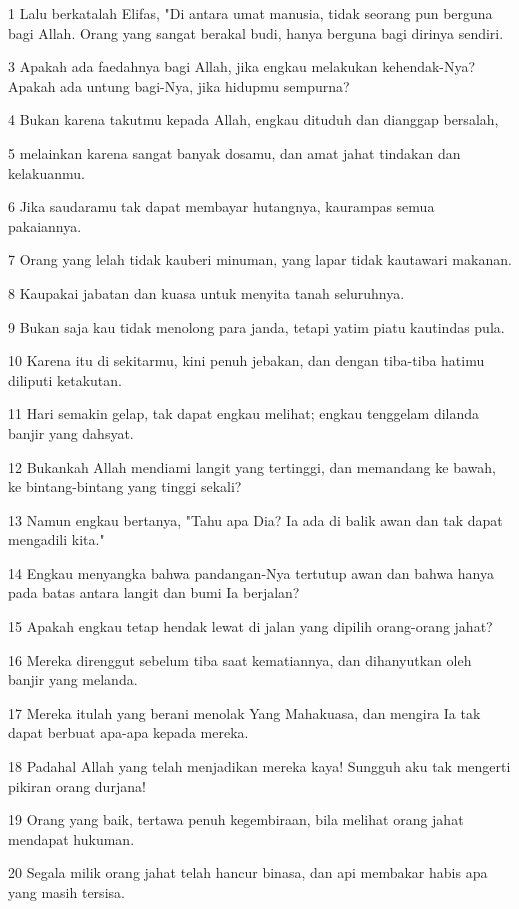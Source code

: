 \par 1 Lalu berkatalah Elifas, "Di antara umat manusia, tidak seorang pun berguna bagi Allah. Orang yang sangat berakal budi, hanya berguna bagi dirinya sendiri.
\par 3 Apakah ada faedahnya bagi Allah, jika engkau melakukan kehendak-Nya? Apakah ada untung bagi-Nya, jika hidupmu sempurna?
\par 4 Bukan karena takutmu kepada Allah, engkau dituduh dan dianggap bersalah,
\par 5 melainkan karena sangat banyak dosamu, dan amat jahat tindakan dan kelakuanmu.
\par 6 Jika saudaramu tak dapat membayar hutangnya, kaurampas semua pakaiannya.
\par 7 Orang yang lelah tidak kauberi minuman, yang lapar tidak kautawari makanan.
\par 8 Kaupakai jabatan dan kuasa untuk menyita tanah seluruhnya.
\par 9 Bukan saja kau tidak menolong para janda, tetapi yatim piatu kautindas pula.
\par 10 Karena itu di sekitarmu, kini penuh jebakan, dan dengan tiba-tiba hatimu diliputi ketakutan.
\par 11 Hari semakin gelap, tak dapat engkau melihat; engkau tenggelam dilanda banjir yang dahsyat.
\par 12 Bukankah Allah mendiami langit yang tertinggi, dan memandang ke bawah, ke bintang-bintang yang tinggi sekali?
\par 13 Namun engkau bertanya, "Tahu apa Dia? Ia ada di balik awan dan tak dapat mengadili kita."
\par 14 Engkau menyangka bahwa pandangan-Nya tertutup awan dan bahwa hanya pada batas antara langit dan bumi Ia berjalan?
\par 15 Apakah engkau tetap hendak lewat di jalan yang dipilih orang-orang jahat?
\par 16 Mereka direnggut sebelum tiba saat kematiannya, dan dihanyutkan oleh banjir yang melanda.
\par 17 Mereka itulah yang berani menolak Yang Mahakuasa, dan mengira Ia tak dapat berbuat apa-apa kepada mereka.
\par 18 Padahal Allah yang telah menjadikan mereka kaya! Sungguh aku tak mengerti pikiran orang durjana!
\par 19 Orang yang baik, tertawa penuh kegembiraan, bila melihat orang jahat mendapat hukuman.
\par 20 Segala milik orang jahat telah hancur binasa, dan api membakar habis apa yang masih tersisa.
